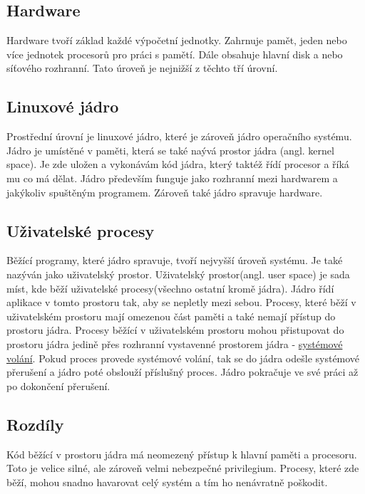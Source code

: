 \subsection{Hardware}
Hardware tvoří základ každé výpočetní jednotky. Zahrnuje pamět, jeden nebo více jednotek procesorů pro práci s pamětí. Dále obsahuje hlavní disk a nebo síťového rozhranní. Tato úroveň je nejnižší z těchto tří
úrovní.

\subsection{Linuxové jádro}
\label{sec:ProstorJadra}

Prostřední úrovní je linuxové jádro\cite{HowLinuxWorks}, které je zároveň jádro operačního systému. Jádro je umístěné v paměti, která se také naývá prostor jádra
(angl. kernel space)\cite{KernelSpace}. Je zde uložen a vykonávám kód jádra, který taktéž řídí procesor a říká mu co má dělat.
Jádro především funguje jako rozhranní mezi hardwarem a jakýkoliv spuštěným programem. Zároveň také jádro spravuje hardware.

\subsection{Uživatelské procesy}
\label{sec:UzivatelskeProcesy}

Běžící programy, které jádro spravuje, tvoří nejvyšší úroveň systému. Je také nazýván jako uživatelský prostor.
Uživatelský prostor(angl. user space)\cite{UserSpace} je sada míst, kde běží uživatelské procesy(všechno ostatní kromě jádra). Jádro řídí aplikace v tomto
prostoru tak, aby se nepletly mezi sebou. Procesy, které běží v uživatelském prostoru mají omezenou část paměti a také nemají přístup do
prostoru jádra. Procesy běžící v uživatelském prostoru mohou přistupovat do prostoru jádra jedině přes rozhranní vystavenné prostorem
jádra - \hyperref[sec:systemoveVolani]{systémové volání}. Pokud proces provede systémové volání, tak se do jádra odešle systémové přerušení
a jádro poté obslouží příslušný proces. Jádro pokračuje ve své práci až po dokončení přerušení.

\subsection*{Rozdíly}
Kód běžící v prostoru jádra má neomezený přístup k hlavní paměti a procesoru. Toto je velice silné, ale zároveň velmi nebezpečné privilegium.
Procesy, které zde běží, mohou snadno havarovat celý systém a tím ho nenávratně poškodit.

